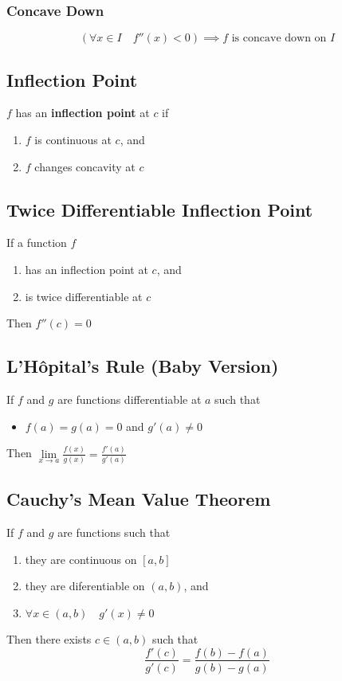 \documentclass[../ma2002_notes.tex]{subfiles}
\begin{document}
\subsubsection{Concave Down}
\[(\forall x\in I\quad f''(x)<0)\implies f\text{ is concave down on }I\]

\subsection{Inflection Point}
\(f\) has an \textbf{inflection point} at \(c\) if
\begin{enumerate}
	\item\(f\) is continuous at \(c\), and
	\item\(f\) changes concavity at \(c\)
\end{enumerate}

\subsection{Twice Differentiable Inflection Point}
If a function \(f\)
\begin{enumerate}
	\item has an inflection point at \(c\), and
	\item is twice differentiable at \(c\)
\end{enumerate}
Then \(f''(c)=0\)

\subsection{L'H\^{o}pital's Rule (Baby Version)}
If \(f\) and \(g\) are functions differentiable at \(a\) such that
\begin{itemize}
	\item\(f(a)=g(a)=0\) and \(g'(a)\ne0\)
\end{itemize}
Then \(\lim\limits_{x\to a}\frac{f(x)}{g(x)}=\frac{f'(a)}{g'(a)}\)

\subsection{Cauchy's Mean Value Theorem}
If \(f\) and \(g\) are functions such that
\begin{enumerate}
	\item they are continuous on \([a,b]\)
	\item they are diferentiable on \((a,b)\), and
	\item\(\forall x\in(a,b)\quad g'(x)\ne0\)
\end{enumerate}
Then there exists \(c\in(a,b)\) such that
\[\frac{f'(c)}{g'(c)}=\frac{f(b)-f(a)}{g(b)-g(a)}\]
\end{document}
